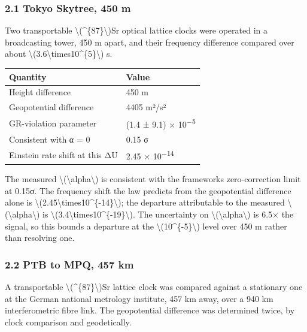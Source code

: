 \documentclass[
  10pt,
]{article}
\begin{document}
\hypertarget{tokyo-skytree-450-m}{%
\subsubsection{2.1 Tokyo Skytree, 450 m}\label{tokyo-skytree-450-m}}

Two transportable \textbackslash(\^{}\{87\}\textbackslash)Sr optical
lattice clocks were operated in a broadcasting tower, 450 m apart, and
their frequency difference compared over about
\textbackslash(3.6\textbackslash times10\^{}\{5\}\textbackslash) s.

\begin{longtable}[]{@{}ll@{}}
\toprule\noalign{}
Quantity & Value \\
\midrule\noalign{}
\endhead
\bottomrule\noalign{}
\endlastfoot
Height difference & 450 m \\
Geopotential difference & 4405 m²/s² \\
GR-violation parameter & (1.4 ± 9.1) × 10\textsuperscript{−5} \\
Consistent with α = 0 & 0.15 σ \\
Einstein rate shift at this ΔU & 2.45 × 10\textsuperscript{−14} \\
\end{longtable}

The measured \textbackslash(\textbackslash alpha\textbackslash) is
consistent with the framework\textquotesingle s zero-correction limit at
0.15σ. The frequency shift the law predicts from the geopotential
difference alone is
\textbackslash(2.45\textbackslash times10\^{}\{-14\}\textbackslash); the
departure attributable to the measured
\textbackslash(\textbackslash alpha\textbackslash) is
\textbackslash(3.4\textbackslash times10\^{}\{-19\}\textbackslash). The
uncertainty on \textbackslash(\textbackslash alpha\textbackslash) is
6.5× the signal, so this bounds a departure at the
\textbackslash(10\^{}\{-5\}\textbackslash) level over 450 m rather than
resolving one.

\hypertarget{ptb-to-mpq-457-km}{%
\subsubsection{2.2 PTB to MPQ, 457 km}\label{ptb-to-mpq-457-km}}

A transportable \textbackslash(\^{}\{87\}\textbackslash)Sr lattice clock
was compared against a stationary one at the German national metrology
institute, 457 km away, over a 940 km interferometric fibre link. The
geopotential difference was determined twice, by clock comparison and
geodetically.
\end{document}

